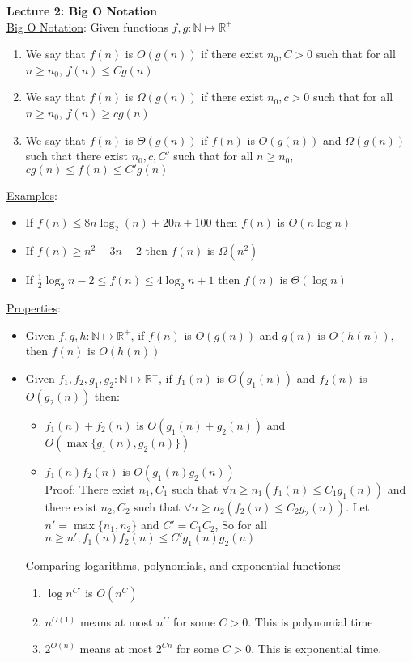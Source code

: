 \documentclass{article}
\begin{document}
\textbf{Lecture 2: Big O Notation} \\[1.0ex]
\underline{Big O Notation}: Given functions $f, g: \mathbb{N} \mapsto \mathbb{R}^+$
\begin{enumerate}
    \item We say that $f(n)$ is $O(g(n))$ if there exist $n_0, C > 0$ such that for all $n \geq n_0$, $f(n) \leq Cg(n)$
    \item We say that $f(n)$ is $\Omega(g(n))$ if there exist $n_0, c > 0$ such that for all $n \geq n_0$, $f(n) \geq c g(n)$
    \item We say that $f(n)$ is $\Theta(g(n))$ if $f(n)$ is $O(g(n))$ and $\Omega(g(n))$ such that there exist $n_0, c, C'$ such that for all $n \geq n_0$, $cg(n) \leq f(n) \leq C'g(n)$
\end{enumerate}
\underline{Examples}: 
\begin{itemize}
    \item If $f(n) \leq 8n\log_2(n) + 20n + 100$ then $f(n)$ is $O(n\log n)$
    \item If $f(n) \geq n^2 - 3n - 2$ then $f(n)$ is $\Omega(n^2)$
    \item If $\frac{1}{2}\log_2 n - 2 \leq f(n) \leq 4 \log_2 n + 1$ then $f(n)$ is $\Theta(\log n)$
\end{itemize}
\underline{Properties}:
\begin{itemize}
    \item Given $f, g, h: \mathbb{N} \mapsto \mathbb{R}^+$, if $f(n)$ is $O(g(n))$ and $g(n)$ is $O(h(n))$, then $f(n)$ is $O(h(n))$
    \item Given $f_1, f_2, g_1, g_2: \mathbb{N} \mapsto \mathbb{R}^+$, if $f_1(n)$ is $O(g_1(n))$ and $f_2(n)$ is $O(g_2(n))$ then:
    \begin{itemize}
         \item $f_1(n) + f_2(n)$ is $O(g_1(n) + g_2(n))$ and $O(\max\{g_1(n), g_2(n)\})$
         \item $f_1(n)f_2(n)$ is $O(g_1(n)g_2(n))$ \\[0.75ex]
         Proof: There exist $n_1, C_1$ such that $\forall n \geq n_1 (f_1(n) \leq C_1 g_1(n))$ and there exist $n_2, C_2$ such that $\forall n \geq n_2 (f_2(n) \leq C_2 g_2(n))$. Let $n' = \max \{n_1, n_2\}$ and $C' = C_1C_2$, So for all $n \geq n', f_1(n)f_2(n) \leq C' g_1(n)g_2(n)$
    \end{itemize}
\underline{Comparing logarithms, polynomials, and exponential functions}: 
\begin{enumerate}
    \item $\log n^{C'}$ is $O(n^C)$
    \item $n^{O(1)}$ means at most $n^C$ for some $C > 0$. This is polynomial time 
    \item $2^{O(n)}$ means at most $2^{Cn}$ for some $C > 0$. This is exponential time. 
\end{enumerate}
\end{itemize}
\end{document}
